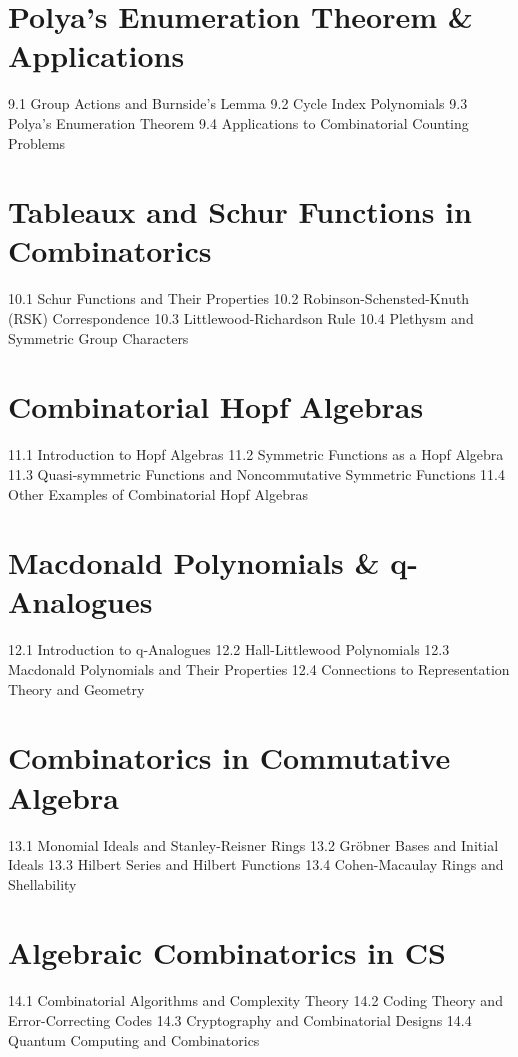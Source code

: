 \section{Polya's Enumeration Theorem \& Applications}
9.1 Group Actions and Burnside's Lemma
9.2 Cycle Index Polynomials
9.3 Polya's Enumeration Theorem
9.4 Applications to Combinatorial Counting Problems
\section{Tableaux and Schur Functions in Combinatorics}
10.1 Schur Functions and Their Properties
10.2 Robinson-Schensted-Knuth (RSK) Correspondence
10.3 Littlewood-Richardson Rule
10.4 Plethysm and Symmetric Group Characters
\section{Combinatorial Hopf Algebras}
11.1 Introduction to Hopf Algebras
11.2 Symmetric Functions as a Hopf Algebra
11.3 Quasi-symmetric Functions and Noncommutative Symmetric Functions
11.4 Other Examples of Combinatorial Hopf Algebras
\section{Macdonald Polynomials \& q-Analogues}
12.1 Introduction to q-Analogues
12.2 Hall-Littlewood Polynomials
12.3 Macdonald Polynomials and Their Properties
12.4 Connections to Representation Theory and Geometry
\section{Combinatorics in Commutative Algebra}
13.1 Monomial Ideals and Stanley-Reisner Rings
13.2 Gröbner Bases and Initial Ideals
13.3 Hilbert Series and Hilbert Functions
13.4 Cohen-Macaulay Rings and Shellability
\section{Algebraic Combinatorics in CS}
14.1 Combinatorial Algorithms and Complexity Theory
14.2 Coding Theory and Error-Correcting Codes
14.3 Cryptography and Combinatorial Designs
14.4 Quantum Computing and Combinatorics
